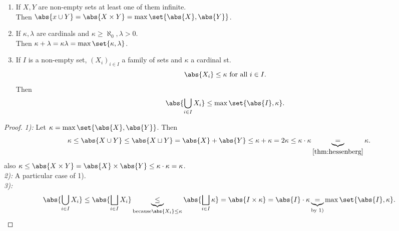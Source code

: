 \begin{corollary}
    \begin{enumerate}[label=\arabic*)]
        \item If $X,Y$ are non-empty sets at least one of them infinite.\\
        Then $\abs{x \cup Y} = \abs{X \times Y} = \max \set{\abs{X}, \abs{Y}}$.

        \item If $\kappa, \lambda$ are cardinals and $\kappa \geq \aleph_0, \lambda > 0$.\\
        Then $\kappa + \lambda = \kappa\lambda = \max \set{\kappa, \lambda}$.

        \item If $I$ is a non-empty set, $(X_i)_{i \in I}$ a family of sets and $\kappa$ a cardinal st.
        $$ \abs{X_i} \leq \kappa \text{ for all } i \in I.$$
        Then $$ \abs{\bigcup_{i \in I} X_i} \leq \max \set{\abs{I}, \kappa}.$$
    \end{enumerate}
\end{corollary}
\begin{proof}
    \emph{1):} Let $\kappa = \max \set{\abs{X}, \abs{Y}}$. Then
    $$ \kappa \leq \abs{X \cup Y} \leq \abs{X \sqcup Y} = \abs{X} + \abs{Y} \leq \kappa + \kappa = 2 \kappa \leq \kappa \cdot \kappa \underbrace{=}_{\cref{thm:hessenberg}} \kappa.$$
    also $\kappa \leq \abs{X \times Y} = \abs{X} \times \abs{Y} \leq \kappa \cdot \kappa = \kappa$.\\
    \emph{2):} A particular case of 1).\\
    \emph{3):} $$ \abs{\bigcup_{i \in I} X_i} \leq \abs{\bigsqcup_{i \in I} X_i} \underbrace{\leq}_{\text{because} \abs{X_i} \leq \kappa}
    \abs{\bigsqcup_{i \in I} \kappa} = \abs{I \times \kappa} = \abs{I} \cdot \kappa \underbrace{=}_{\text{by 1)}} \max \set{\abs{I}, \kappa}.$$
\end{proof}

